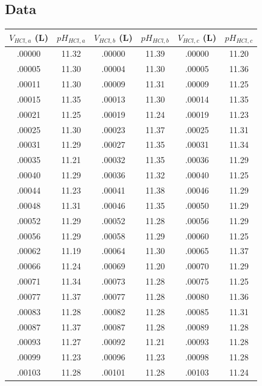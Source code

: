 \documentclass[10pt,twoside]{report}
\begin{document}
\begin{appendices}
\chapter{Data}
\begin{longtable}{|c|c||c|c||c|c|}
    \hline
    $V_{HCl,a}$ (L) & $pH_{HCl,a}$ & $V_{HCl,b}$ (L) & $pH_{HCl,b}$ & $V_{HCl,c}$ (L) & $pH_{HCl,c}$ \\\hline
.00000 & 11.32 & .00000 & 11.39 & .00000 & 11.20\\\hline
.00005 & 11.30 & .00004 & 11.30 & .00005 & 11.36\\\hline
.00011 & 11.30 & .00009 & 11.31 & .00009 & 11.25\\\hline
.00015 & 11.35 & .00013 & 11.30 & .00014 & 11.35\\\hline
.00021 & 11.25 & .00019 & 11.24 & .00019 & 11.23\\\hline
.00025 & 11.30 & .00023 & 11.37 & .00025 & 11.31\\\hline
.00031 & 11.29 & .00027 & 11.35 & .00031 & 11.34\\\hline
.00035 & 11.21 & .00032 & 11.35 & .00036 & 11.29\\\hline
.00040 & 11.29 & .00036 & 11.32 & .00040 & 11.25\\\hline
.00044 & 11.23 & .00041 & 11.38 & .00046 & 11.29\\\hline
.00048 & 11.31 & .00046 & 11.35 & .00050 & 11.29\\\hline
.00052 & 11.29 & .00052 & 11.28 & .00056 & 11.29\\\hline
.00056 & 11.29 & .00058 & 11.29 & .00060 & 11.25\\\hline
.00062 & 11.19 & .00064 & 11.30 & .00065 & 11.37\\\hline
.00066 & 11.24 & .00069 & 11.20 & .00070 & 11.29\\\hline
.00071 & 11.34 & .00073 & 11.28 & .00075 & 11.25\\\hline
.00077 & 11.37 & .00077 & 11.28 & .00080 & 11.36\\\hline
.00083 & 11.28 & .00082 & 11.28 & .00085 & 11.31\\\hline
.00087 & 11.37 & .00087 & 11.28 & .00089 & 11.28\\\hline
.00093 & 11.27 & .00092 & 11.21 & .00093 & 11.28\\\hline
.00099 & 11.23 & .00096 & 11.23 & .00098 & 11.28\\\hline
.00103 & 11.28 & .00101 & 11.28 & .00103 & 11.24\\\hline

\end{longtable}
\end{appendices}
\end{document}
